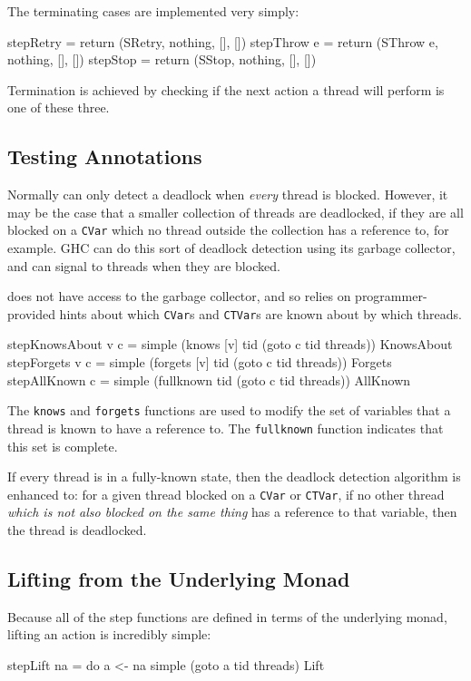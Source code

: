 The terminating cases are implemented very simply:

\begin{haskellcode}
stepRetry   = return (SRetry,   nothing, [], [])
stepThrow e = return (SThrow e, nothing, [], [])
stepStop    = return (SStop,    nothing, [], [])
\end{haskellcode}

Termination is achieved by checking if the next action a thread will
perform is one of these three.

\subsection{Testing Annotations}
\label{sec:execution-stepwise-annotations}

Normally \dejafu{} can only detect a deadlock when \emph{every} thread
is blocked. However, it may be the case that a smaller collection of
threads are deadlocked, if they are all blocked on a \verb|CVar| which
no thread outside the collection has a reference to, for example. GHC
can do this sort of deadlock detection using its garbage collector,
and can signal to threads when they are blocked.

\dejafu{} does not have access to the garbage collector, and so relies
on programmer-provided hints about which \verb|CVar|s and
\verb|CTVar|s are known about by which threads.

\begin{haskellcode}
stepKnowsAbout v c = simple (knows   [v] tid (goto c tid threads)) KnowsAbout
stepForgets    v c = simple (forgets [v] tid (goto c tid threads)) Forgets
stepAllKnown     c = simple (fullknown   tid (goto c tid threads)) AllKnown
\end{haskellcode}

The \verb|knows| and \verb|forgets| functions are used to modify the
set of variables that a thread is known to have a reference to. The
\verb|fullknown| function indicates that this set is complete.

If every thread is in a fully-known state, then the deadlock detection
algorithm is enhanced to: for a given thread blocked on a \verb|CVar|
or \verb|CTVar|, if no other thread \emph{which is not also blocked on
  the same thing} has a reference to that variable, then the thread is
deadlocked.

\subsection{Lifting from the Underlying Monad}
\label{sec:execution-stepwise-lift}

Because all of the step functions are defined in terms of the
underlying monad, lifting an action is incredibly simple:

\begin{haskellcode}
stepLift na = do
  a <- na
  simple (goto a tid threads) Lift
\end{haskellcode}
